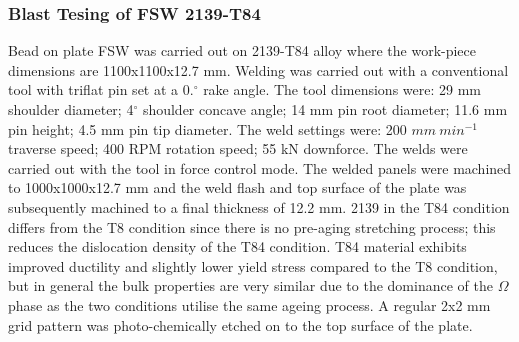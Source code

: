 \subsubsection{Blast Tesing of FSW 2139-T84}
\label{EMBlastTesting}
Bead on plate FSW was carried out on 2139-T84 alloy where the work-piece dimensions are 1100x1100x12.7 mm. Welding was carried out with a conventional tool with triflat pin set at a 0.$^\circ$ rake angle. The tool dimensions were: 29 mm shoulder diameter; 4$^\circ$ shoulder concave angle; 14 mm pin root diameter; 11.6 mm pin height; 4.5 mm pin tip diameter. The weld settings were: 200 $mm\:min^{-1}$ traverse speed; 400 RPM rotation speed; 55 kN downforce. The welds were carried out with the tool in force control mode. The welded panels were machined to 1000x1000x12.7 mm and the weld flash and top surface of the plate was subsequently machined to a final thickness of 12.2 mm. 2139 in the T84 condition differs from the T8 condition since there is no pre-aging stretching process; this reduces the dislocation density of the T84 condition. T84 material exhibits improved ductility and slightly lower yield stress compared to the T8 condition, but in general the bulk properties are very similar due to the dominance of the $\Omega$ phase as the two conditions utilise the same ageing process. A regular 2x2 mm grid pattern was photo-chemically etched on to the top surface of the plate.


